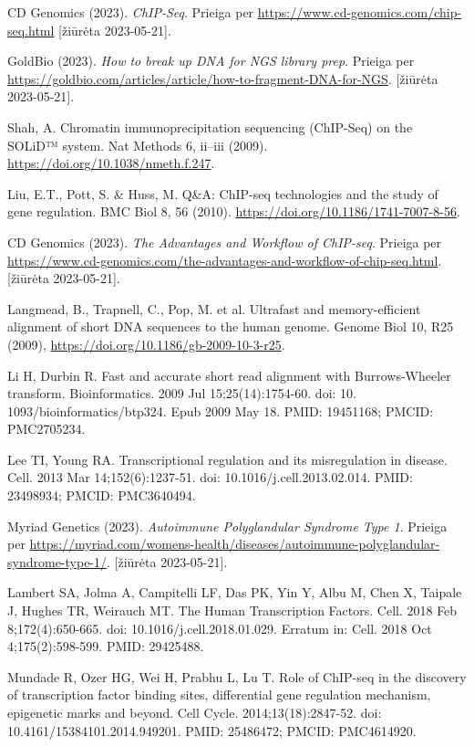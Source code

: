 \documentclass[12pt]{article}
\begin{document}
\begin{thebibliography}{99}
CD Genomics (2023). \emph{ChIP-Seq}.
Prieiga per \url{https://www.cd-genomics.com/chip-seq.html}
[žiūrėta 2023-05-21].

GoldBio (2023). \emph{How to break up DNA for NGS library prep}.
Prieiga per \url{https://goldbio.com/articles/article/how-to-fragment-DNA-for-NGS}.
[žiūrėta 2023-05-21].

 Shah, A. Chromatin immunoprecipitation sequencing (ChIP-Seq)
on the SOLiD™ system. Nat Methods 6, ii–iii (2009).
\url{https://doi.org/10.1038/nmeth.f.247}.

 Liu, E.T., Pott, S. \& Huss, M. Q\&A: ChIP-seq technologies
and the study of gene regulation. BMC Biol 8, 56 (2010).
\url{https://doi.org/10.1186/1741-7007-8-56}.

CD Genomics (2023). \emph{The Advantages and Workflow of ChIP-seq}.
Prieiga per \url{https://www.cd-genomics.com/the-advantages-and-workflow-of-chip-seq.html}.
[žiūrėta 2023-05-21].

 Langmead, B., Trapnell, C., Pop, M. et al. Ultrafast and
memory-efficient alignment of short DNA sequences to the human genome. Genome
Biol 10, R25 (2009), \newline
\url{https://doi.org/10.1186/gb-2009-10-3-r25}.

 Li H, Durbin R. Fast and accurate short read alignment with
Burrows-Wheeler transform. Bioinformatics. 2009 Jul 15;25(14):1754-60. doi: 10.
1093/bioinformatics/btp324. Epub 2009 May 18. PMID: 19451168; PMCID: PMC2705234.

 Lee TI, Young RA. Transcriptional regulation and its
misregulation in disease. Cell. 2013 Mar 14;152(6):1237-51.
doi: 10.1016/j.cell.2013.02.014. PMID: 23498934; PMCID: PMC3640494.

Myriad Genetics (2023). \emph{Autoimmune Polyglandular Syndrome Type 1}.
Prieiga per \url{https://myriad.com/womens-health/diseases/autoimmune-polyglandular-syndrome-type-1/}.
[žiūrėta 2023-05-21].

 Lambert SA, Jolma A, Campitelli LF, Das PK, Yin Y, Albu M,
Chen X, Taipale J, Hughes TR, Weirauch MT. The Human Transcription Factors.
Cell. 2018 Feb 8;172(4):650-665. doi: 10.1016/j.cell.2018.01.029.
Erratum in: Cell. 2018 Oct 4;175(2):598-599. PMID: 29425488.

 Mundade R, Ozer HG, Wei H, Prabhu L, Lu T. Role of ChIP-seq
in the discovery of transcription factor binding sites, differential gene
regulation mechanism, epigenetic marks and beyond. Cell Cycle.
2014;13(18):2847-52. doi: 10.4161/15384101.2014.949201. PMID: 25486472;
PMCID: PMC4614920.


\end{thebibliography}
\end{document}
